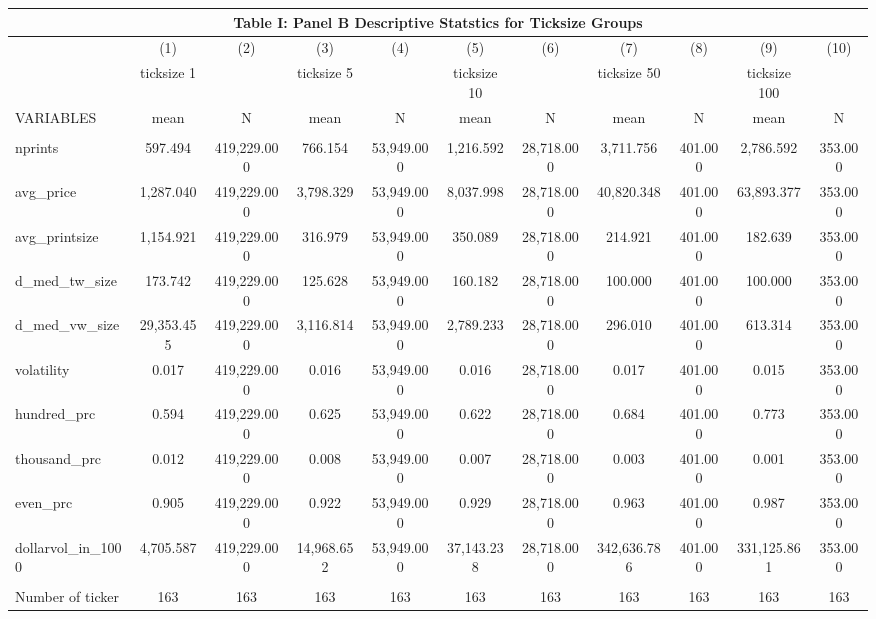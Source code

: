 \documentclass[]{article}
\begin{document}
\begin{tabular}{lcccccccccc}
\multicolumn{11}{c}{Table I: Panel B Descriptive Statstics for Ticksize Groups} \\ \hline
 & (1) & (2) & (3) & (4) & (5) & (6) & (7) & (8) & (9) & (10) \\
 & ticksize 1 &  & ticksize 5 &  & ticksize 10 &  & ticksize 50 &  & ticksize 100 &  \\
VARIABLES & mean & N & mean & N & mean & N & mean & N & mean & N \\ \hline
 &  &  &  &  &  &  &  &  &  &  \\
nprints & 597.494 & 419,229.000 & 766.154 & 53,949.000 & 1,216.592 & 28,718.000 & 3,711.756 & 401.000 & 2,786.592 & 353.000 \\
avg\_price & 1,287.040 & 419,229.000 & 3,798.329 & 53,949.000 & 8,037.998 & 28,718.000 & 40,820.348 & 401.000 & 63,893.377 & 353.000 \\
avg\_printsize & 1,154.921 & 419,229.000 & 316.979 & 53,949.000 & 350.089 & 28,718.000 & 214.921 & 401.000 & 182.639 & 353.000 \\
d\_med\_tw\_size & 173.742 & 419,229.000 & 125.628 & 53,949.000 & 160.182 & 28,718.000 & 100.000 & 401.000 & 100.000 & 353.000 \\
d\_med\_vw\_size & 29,353.455 & 419,229.000 & 3,116.814 & 53,949.000 & 2,789.233 & 28,718.000 & 296.010 & 401.000 & 613.314 & 353.000 \\
volatility & 0.017 & 419,229.000 & 0.016 & 53,949.000 & 0.016 & 28,718.000 & 0.017 & 401.000 & 0.015 & 353.000 \\
hundred\_prc & 0.594 & 419,229.000 & 0.625 & 53,949.000 & 0.622 & 28,718.000 & 0.684 & 401.000 & 0.773 & 353.000 \\
thousand\_prc & 0.012 & 419,229.000 & 0.008 & 53,949.000 & 0.007 & 28,718.000 & 0.003 & 401.000 & 0.001 & 353.000 \\
even\_prc & 0.905 & 419,229.000 & 0.922 & 53,949.000 & 0.929 & 28,718.000 & 0.963 & 401.000 & 0.987 & 353.000 \\
dollarvol\_in\_1000 & 4,705.587 & 419,229.000 & 14,968.652 & 53,949.000 & 37,143.238 & 28,718.000 & 342,636.786 & 401.000 & 331,125.861 & 353.000 \\
 &  &  &  &  &  &  &  &  &  &  \\
 Number of ticker & 163 & 163 & 163 & 163 & 163 & 163 & 163 & 163 & 163 & 163 \\ \hline
\end{tabular}
\end{document}
